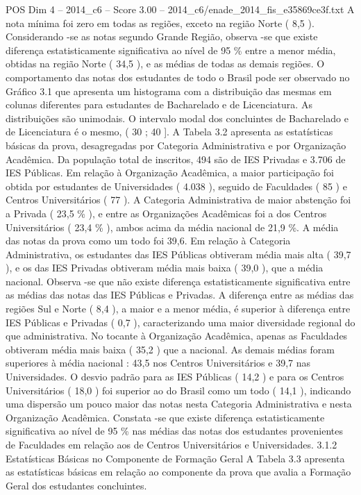 \begin{textsample}{POS Dim 4 – 2014\_c6 – Score 3.00 – 2014\_c6/enade\_2014\_fis\_e35869ce3f.txt}
A nota mínima foi zero em todas as regiões, exceto na região Norte ( 8,5 ).
Considerando -se as notas segundo Grande Região, observa -se que existe diferença estatisticamente significativa ao nível de 95 \% entre a menor média, obtidas na região Norte ( 34,5 ), e as médias de todas as demais regiões.
O comportamento das notas dos estudantes de todo o Brasil pode ser observado no Gráfico 3.1 que apresenta um histograma com a distribuição das mesmas em colunas diferentes para estudantes de Bacharelado e de Licenciatura.
As distribuições são unimodais.
O intervalo modal dos concluintes de Bacharelado e de Licenciatura é o mesmo, ( 30 ; 40 ].
A Tabela 3.2 apresenta as estatísticas básicas da prova, desagregadas por Categoria Administrativa e por Organização Acadêmica.
Da população total de inscritos, 494 são de IES Privadas e 3.706 de IES Públicas.
Em relação à Organização Acadêmica, a maior participação foi obtida por estudantes de Universidades ( 4.038 ), seguido de Faculdades ( 85 ) e Centros Universitários ( 77 ).
A Categoria Administrativa de maior abstenção foi a Privada ( 23,5 \% ), e entre as Organizações Acadêmicas foi a dos Centros Universitários ( 23,4 \% ), ambos acima da média nacional de 21,9 \%.
A média das notas da prova como um todo foi 39,6.
Em relação à Categoria Administrativa, os estudantes das IES Públicas obtiveram média mais alta ( 39,7 ), e os das IES Privadas obtiveram média mais baixa ( 39,0 ), que a média nacional.
Observa -se que não existe diferença estatisticamente significativa entre as médias das notas das IES Públicas e Privadas.
A diferença entre as médias das regiões Sul e Norte ( 8,4 ), a maior e a menor média, é superior à diferença entre IES Públicas e Privadas ( 0,7 ), caracterizando uma maior diversidade regional do que administrativa.
No tocante à Organização Acadêmica, apenas as Faculdades obtiveram média mais baixa ( 35,2 ) que a nacional.
As demais médias foram superiores à média nacional : 43,5 nos Centros Universitários e 39,7 nas Universidades.
O desvio padrão para as IES Públicas ( 14,2 ) e para os Centros Universitários ( 18,0 ) foi superior ao do Brasil como um todo ( 14,1 ), indicando uma dispersão um pouco maior das notas nesta Categoria Administrativa e nesta Organização Acadêmica.
Constata -se que existe diferença estatisticamente significativa ao nível de 95 \% nas médias das notas dos estudantes provenientes de Faculdades em relação aos de Centros Universitários e Universidades. 3.1.2 Estatísticas Básicas no Componente de Formação Geral A Tabela 3.3 apresenta as estatísticas básicas em relação ao componente da prova que avalia a Formação Geral dos estudantes concluintes.

\end{textsample}
